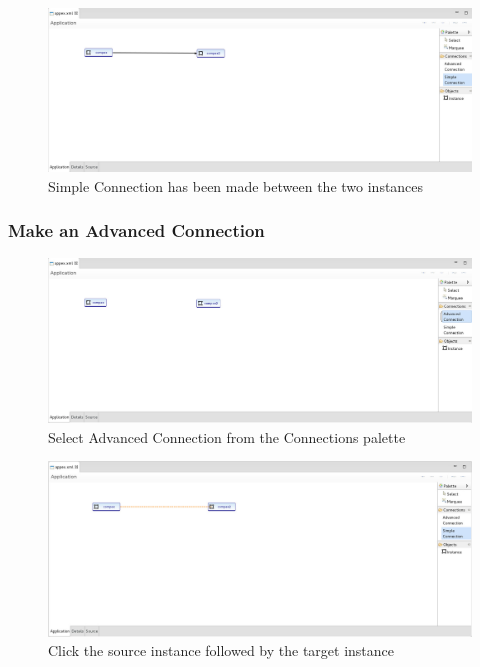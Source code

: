 \begin{flushleft}
\begin{figure}[h!]
    \centering
	\includegraphics[scale=0.31]{figures/connect-complete.jpg}
	\caption{Simple Connection has been made between the two instances}
	\label{fig:figure21}
\end{figure}
\newpage

\subsubsection{Make an Advanced Connection}
\label{sec:add_advanced_connection}

\begin{figure}[h!]
    \centering
	\includegraphics[scale=0.31]{figures/connection-selected.jpg}
	\caption{Select Advanced Connection from the Connections palette}
	\label{fig:figure22}
\end{figure}

\begin{figure}[h!]
    \centering
	\includegraphics[scale=0.31]{figures/connect-made.jpg}
	\caption{Click the source instance followed by the target instance}
	\label{fig:figure23}
\end{figure}


\end{flushleft}
